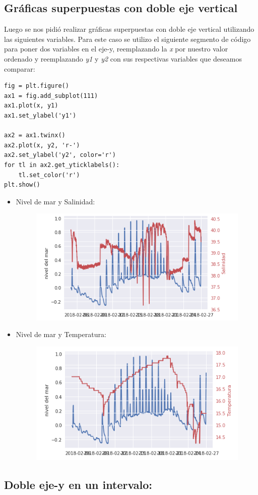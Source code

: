 \documentclass{article}
\begin{document}
\newpage

\subsection{Gráficas superpuestas con doble eje vertical}

Luego se nos pidió realizar gráficas superpuestas con doble eje vertical utilizando las siguientes variables.
Para este caso se utilizo el siguiente segmento de código para poner dos variables en el eje-y, reemplazando la \textit{x} por nuestro valor ordenado y reemplazando \textit{y1} y \textit{y2} con sus respectivas variables que deseamos comparar:
\begin{verbatim}
fig = plt.figure()
ax1 = fig.add_subplot(111)
ax1.plot(x, y1)
ax1.set_ylabel('y1')

ax2 = ax1.twinx()
ax2.plot(x, y2, 'r-')
ax2.set_ylabel('y2', color='r')
for tl in ax2.get_yticklabels():
	tl.set_color('r')
plt.show()
\end{verbatim}

\begin{itemize}
\item Nivel de mar y Salinidad:
\begin{figure}[h!]
\centering
\includegraphics[width=0.4\linewidth]{nivel-sal-tiempo.png}
\end{figure}

\item Nivel de mar y Temperatura:
\begin{figure}[ht!]
\centering
\includegraphics[width=0.4\linewidth]{nivel-temp-tiempo.png}
\end{figure}

\end{itemize}

\newpage

\subsection{Doble eje-y en un intervalo:}
\end{document}
